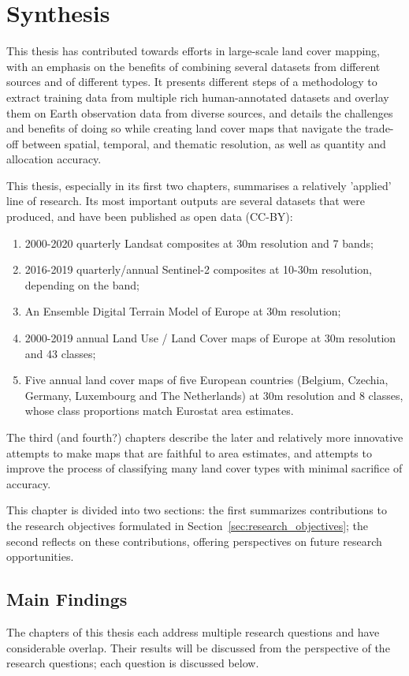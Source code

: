 \chapter[Synthesis]{Synthesis}
\label{cha:Chapter6}
\newpage

This thesis has contributed towards efforts in large-scale land cover mapping, with an emphasis on the benefits of combining several datasets from different sources and of different types.  It presents different steps of a methodology to extract training data from multiple rich human-annotated datasets and overlay them on Earth observation data from diverse sources, and details the challenges and benefits of doing so while creating land cover maps that navigate the trade-off between spatial, temporal, and thematic resolution, as well as quantity and allocation accuracy.

This thesis, especially in its first two chapters, summarises a relatively 'applied' line of research. Its most important outputs are several datasets that were produced, and have been published as open data (CC-BY):
\begin{enumerate}
    \item 2000-2020 quarterly Landsat composites at 30m resolution and 7 bands;
    \item 2016-2019 quarterly/annual Sentinel-2 composites at 10-30m resolution, depending on the band;
    \item An Ensemble Digital Terrain Model of Europe at 30m resolution;
    \item 2000-2019 annual Land Use / Land Cover maps of Europe at 30m resolution and 43 classes;
    \item Five annual land cover maps of five European countries (Belgium, Czechia, Germany, Luxembourg and The Netherlands) at 30m resolution and 8 classes, whose class proportions match Eurostat area estimates.
\end{enumerate}
The third (and fourth?) chapters describe the later and relatively more innovative attempts to make maps that are faithful to area estimates, and attempts to improve the process of classifying many land cover types with minimal sacrifice of accuracy.

This chapter is divided into two sections: the first summarizes contributions to the research objectives formulated in Section~\ref{sec:research_objectives}; the second reflects on these contributions, offering perspectives on future research opportunities. 

\section{Main Findings}
    The chapters of this thesis each address multiple research questions and have considerable overlap. Their results will be discussed from the perspective of the research questions; each question is discussed below.
    
